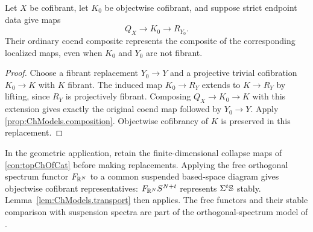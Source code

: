 \begin{lem}\label{lem:ChModels.transport}
    Let $X$ be cofibrant, let $K_0$ be objectwise cofibrant, and suppose strict endpoint data give maps
    \[
        Q_X\longrightarrow K_0\longrightarrow R_{Y_0}.
    \]
    Their ordinary coend composite represents the composite of the corresponding localized maps, even when $K_0$ and $Y_0$ are not fibrant.
\end{lem}
\begin{proof}
    Choose a fibrant replacement $Y_0\to Y$ and a projective trivial cofibration $K_0\to K$ with $K$ fibrant. The induced map $K_0\to R_Y$ extends to $K\to R_Y$ by lifting, since $R_Y$ is projectively fibrant. Composing $Q_X\to K_0\to K$ with this extension gives exactly the original coend map followed by $Y_0\to Y$. Apply \cref{prop:ChModels.composition}. Objectwise cofibrancy of $K$ is preserved in this replacement.
\end{proof}

In the geometric application, retain the finite-dimensional collapse maps of \cref{con:topChOfCat} before making replacements. Applying the free orthogonal spectrum functor $F_{\mathbb{R}^N}$ to a common suspended based-space diagram gives objectwise cofibrant representatives: $F_{\mathbb{R}^N}S^{N+t}$ represents $\Sigma^t\mathbb{S}$ stably. Lemma~\ref{lem:ChModels.transport} then applies. The free functors and their stable comparison with suspension spectra are part of the orthogonal-spectrum model of \cite[Section~2]{MMSS01}.

